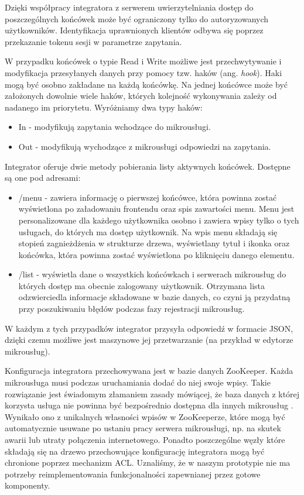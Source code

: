 \documentclass[licencjacka]{pracamgr}
\begin{document}
Dzięki współpracy integratora z serwerem uwierzytelniania dostęp do poszczególnych
końcówek może być ograniczony tylko do autoryzowanych użytkowników. Identyfikacja
uprawnionych klientów odbywa się poprzez przekazanie tokenu sesji w parametrze zapytania.

W przypadku końcówek o typie Read i Write możliwe jest przechwytywanie i modyfikacja
przesyłanych danych przy pomocy tzw. haków (ang. \textit{hook}). Haki mogą być
osobno zakładane na każdą końcówkę. Na jednej końcówce może być założonych dowolnie
wiele haków, których kolejność wykonywania zależy od nadanego im priorytetu.
Wyróżniamy dwa typy haków:
\begin{itemize}
	\item In - modyfikują zapytania wchodzące do mikrousługi.
	\item Out - modyfikują wychodzące z mikrousługi odpowiedzi na zapytania.
\end{itemize}

Integrator oferuje dwie metody pobierania listy aktywnych końcówek. Dostępne są
one pod adresami:
\begin{itemize}
	\item /menu - zawiera informację o pierwszej końcówce, która powinna zostać
	wyświetlona po załadowaniu frontendu oraz spis zawartości menu. Menu jest
	personalizowane dla każdego użytkownika osobno i zawiera wpisy tylko o tych
	usługach, do których ma dostęp użytkownik. Na wpis menu składają się stopień
	zagnieżdżenia w strukturze drzewa, wyświetlany tytuł i ikonka oraz końcówka,
	która powinna zostać wyświetlona po kliknięciu danego elementu.
	\item /list - wyświetla dane o wszystkich końcówkach i serwerach mikrousług
	do których dostęp ma obecnie zalogowany użytkownik. Otrzymana lista odzwierciedla
	informacje składowane w bazie danych, co czyni ją przydatną przy poszukiwaniu
	błędów podczas fazy rejestracji mikrousług.
\end{itemize}
W każdym z tych przypadków integrator przysyła odpowiedź w formacie JSON, dzięki
czemu możliwe jest maszynowe jej przetwarzanie (na przykład w edytorze mikrousług).

Konfiguracja integratora przechowywana jest w bazie danych ZooKeeper. Każda
mikrousługa musi podczas uruchamiania dodać do niej swoje wpisy. Takie rozwiązanie
jest świadomym złamaniem zasady mówiącej, że baza danych z której korzysta usługa
nie powinna być bezpośrednio dostępna dla innych mikrousług \cite{microsvc}.
Wynikało ono z unikalnych własności wpisów w ZooKeeperze, które mogą być automatycznie
usuwane po ustaniu pracy serwera mikrousługi, np. na skutek awarii lub utraty
połączenia internetowego. Ponadto poszczególne węzły które składają się na drzewo
przechowujące konfigurację integratora mogą być chronione poprzez mechanizm ACL.
Uznaliśmy, że w naszym prototypie nie ma potrzeby reimplementowania funkcjonalności
zapewnianej przez gotowe komponenty.
\end{document}
